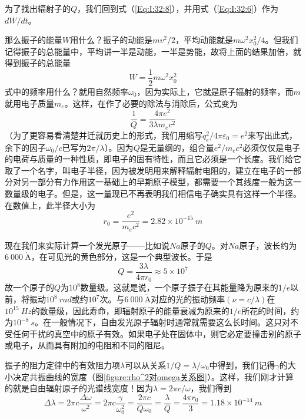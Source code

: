 为了找出辐射子的$Q$，我们回到式（\ref{Eq:I:32:8}），并用式（\ref{Eq:I:32:6}）作为$dW/dt$。

那么振子的能量$W$用什么？振子的动能是$mv^2/2$，平均动能就是$m\omega^2x_0^2/4$。但我们记得振子的总能量中，平均讲一半是动能，一半是势能，故将上面的结果加倍，就得到振子的总能量
\begin{equation}
    \label{Eq:I:32:9}
    W = \frac{1}{2}m\omega^2x_0^2
\end{equation}
式中的频率用什么？就用自然频率$\omega_0$，因为实际上，它就是原子辐射的频率，而$m$就用电子质量$m_e$。这样，在作了必要的除法与消除后，公式变为
\begin{equation}
    \label{Eq:I:32:10}
    \frac{1}{Q} = \frac{4\pi e^2}{3\lambda m_ec^2}
\end{equation}
（为了更容易看清楚并迁就历史上的形式，我们用缩写$q_e^2/4\pi\varepsilon_0=e^2$来写出此式，余下的因子$\omega_0/c$已写为$2\pi/\lambda$）。因为$Q$是无量纲的，组合量$e^2/m_ec^2$必须仅仅是电子的电荷与质量的一种性质，即电子的固有特性，而且它必须是一个长度。我们给它取了一个名字，叫电子半径，因为被发明用来解释辐射电阻的，建立在电子的一部分对另一部分有力作用这一基础上的早期原子模型，都需要一个其线度一般为这一数量级的电子。但是，这一量现已不再表明我们相信电子确实具有这样一个半径。在数值上，此半径大小为
\begin{equation}
    \label{Eq:I:32:11}
    r_0=\frac{e^2}{m_ec^2} = 2.82 \times 10^{-15}~m
\end{equation}

现在我们来实际计算一个发光原子——比如说$Na$原子的$Q$。对$Na$原子，波长约为$6~000~\mathring{\text{A}}$，在可见光的黄色部分，这是一个典型波长。于是
\begin{equation}
    \label{Eq:I:32:12}
    Q=\frac{3\lambda}{4\pi r_0} \approx 5 \times 10^7
\end{equation}
故一个原子的$Q$为$10^8$数量级。这就是说，一个原子振子在其能量降为原来的$1/e$以前，将振动$10^8~rad$或约$10^7$次。与$6~000~\mathring{\text{A}}$对应的光的振动频率$(\nu=c/\lambda)$在$10^{15}~Hz$的数量级，因此寿命，即辐射原子的能量衰减为原来的$1/e$所花的时间，约为$10^{-8}~s$。在一般情况下，自由发光原子辐射时通常就需要这么长时间。这只对不受任何干扰的真空中的原子有效。如果电子处在固体中，则它必定要撞击别的原子或电子，从而具有附加的电阻和不同的阻尼。

振子的阻力定律中的有效阻力项$\lambda$可以从关系$1/Q=\lambda/\omega_0$中得到，我们记得$\gamma$的大小决定共振曲线的宽度（图\ref{figure:rho^2对omega关系图}）。这样，我们刚才计算的就是自由辐射原子的光谱线宽度！因为$\lambda=2\pi c/\omega$，我们得到
\begin{equation}
    \label{Eq:I:32:13}
    \Delta\lambda = 2\pi c \frac{\Delta\omega}{\omega^2} = 2\pi c \frac{\gamma}{\omega_0^2} = \frac{2\pi c}{Q\omega_0} = \frac{\lambda}{Q} = \frac{4\pi r_0}{3} = 1.18 \times 10^{-14}~m
\end{equation}

